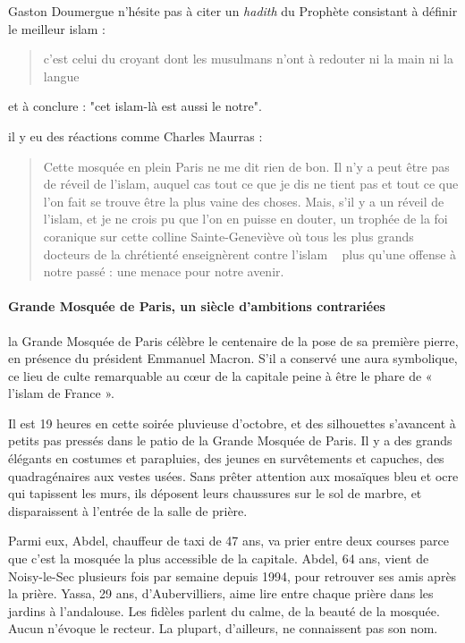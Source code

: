 Gaston Doumergue n'hésite pas à citer un \emph{hadith} du Prophète consistant à définir le meilleur islam : 
\begin{quote}
    c'est celui du croyant dont les musulmans n'ont à redouter ni la main ni la langue
\end{quote}
et à conclure : "cet islam-là est aussi le notre".


il y eu des réactions comme Charles Maurras : 
\begin{quote}
    Cette mosquée en plein Paris ne me dit rien de
bon. Il n'y a peut être pas de réveil de l'islam, auquel cas tout ce
que je dis ne tient pas et tout ce que l'on fait se trouve être la plus vaine des choses. Mais, s'il y a un réveil de l'islam, et je ne
crois pu que l'on en puisse en douter, un trophée de la foi coranique sur cette colline Sainte-Geneviève où tous les plus grands docteurs
de la chrétienté enseignèrent contre l'islam ~ plus
qu'une offense à notre passé : une menace pour notre avenir. 
\end{quote}


\paragraph{Grande Mosquée de Paris, un siècle d’ambitions contrariées }

 la Grande Mosquée de Paris célèbre le centenaire de la pose de sa première pierre, en présence du président Emmanuel Macron. S’il a conservé une aura symbolique, ce lieu de culte remarquable au cœur de la capitale peine à être le phare de « l’islam de France ».

 
 
Il est 19 heures en cette soirée pluvieuse d’octobre, et des silhouettes s’avancent à petits pas pressés dans le patio de la Grande Mosquée de Paris. Il y a des grands élégants en costumes et parapluies, des jeunes en survêtements et capuches, des quadragénaires aux vestes usées. Sans prêter attention aux mosaïques bleu et ocre qui tapissent les murs, ils déposent leurs chaussures sur le sol de marbre, et disparaissent à l’entrée de la salle de prière.

Parmi eux, Abdel, chauffeur de taxi de 47 ans, va prier entre deux courses parce que c’est la mosquée la plus accessible de la capitale. Abdel, 64 ans, vient de Noisy-le-Sec plusieurs fois par semaine depuis 1994, pour retrouver ses amis après la prière. Yassa, 29 ans, d’Aubervilliers, aime lire entre chaque prière dans les jardins à l’andalouse. Les fidèles parlent du calme, de la beauté de la mosquée. Aucun n’évoque le recteur. La plupart, d’ailleurs, ne connaissent pas son nom.
 
